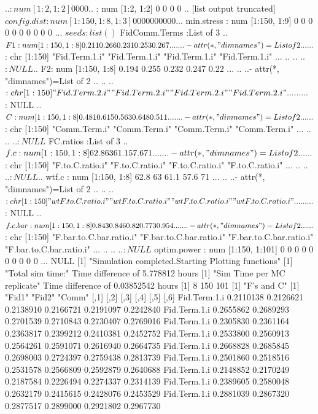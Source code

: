\documentclass[11pt]{article} %
\begin{document}
\begin{Schunk}
\begin{Soutput}
  ..$ : num [1:2, 1:2] 0 0 0 0
  ..$ : num [1:2, 1:2] 0 0 0 0
  .. [list output truncated]
 $ config.dist       : num [1:150, 1:8, 1:3] 0 0 0 0 0 0 0 0 0 0 ...
 $ min.stress        : num [1:150, 1:9] 0 0 0 0 0 0 0 0 0 0 ...
 $ seeds             : list()
 $ FidComm.Terms     :List of 3
  ..$ F1: num [1:150, 1:8] 0.211 0.266 0.231 0.253 0.267 ...
  .. ..- attr(*, "dimnames")=List of 2
  .. .. ..$ : chr [1:150] "Fid.Term.1.i" "Fid.Term.1.i" "Fid.Term.1.i" "Fid.Term.1.i" ...
  .. .. ..$ : NULL
  ..$ F2: num [1:150, 1:8] 0.194 0.255 0.232 0.247 0.22 ...
  .. ..- attr(*, "dimnames")=List of 2
  .. .. ..$ : chr [1:150] "Fid.Term.2.i" "Fid.Term.2.i" "Fid.Term.2.i" "Fid.Term.2.i" ...
  .. .. ..$ : NULL
  ..$ C : num [1:150, 1:8] 0.481 0.615 0.563 0.648 0.511 ...
  .. ..- attr(*, "dimnames")=List of 2
  .. .. ..$ : chr [1:150] "Comm.Term.i" "Comm.Term.i" "Comm.Term.i" "Comm.Term.i" ...
  .. .. ..$ : NULL
 $ FC.ratios         :List of 3
  ..$ f.c    : num [1:150, 1:8] 62.8 63 61.1 57.6 71 ...
  .. ..- attr(*, "dimnames")=List of 2
  .. .. ..$ : chr [1:150] "F.to.C.ratio.i" "F.to.C.ratio.i" "F.to.C.ratio.i" "F.to.C.ratio.i" ...
  .. .. ..$ : NULL
  ..$ wtf.c  : num [1:150, 1:8] 62.8 63 61.1 57.6 71 ...
  .. ..- attr(*, "dimnames")=List of 2
  .. .. ..$ : chr [1:150] "wtF.to.C.ratio.i" "wtF.to.C.ratio.i" "wtF.to.C.ratio.i" "wtF.to.C.ratio.i" ...
  .. .. ..$ : NULL
  ..$ f.c.bar: num [1:150, 1:8] 0.843 0.846 0.82 0.773 0.954 ...
  .. ..- attr(*, "dimnames")=List of 2
  .. .. ..$ : chr [1:150] "F.bar.to.C.bar.ratio.i" "F.bar.to.C.bar.ratio.i" "F.bar.to.C.bar.ratio.i" "F.bar.to.C.bar.ratio.i" ...
  .. .. ..$ : NULL
 $ optim.power       : num [1:150, 1:101] 0 0 0 0 0 0 0 0 0 0 ...
NULL
[1] "Simulation completed.Starting Plotting functions"
[1] "Total sim time:"
Time difference of 5.778812 hours
[1] "Sim Time per MC replicate"
Time difference of 0.03852542 hours
[1]   8 150 101
[1] "F's and C"
[1] "Fid1" "Fid2" "Comm"
                  [,1]      [,2]      [,3]      [,4]      [,5]      [,6]
Fid.Term.1.i 0.2110138 0.2126621 0.2138910 0.2166721 0.2191097 0.2242840
Fid.Term.1.i 0.2655862 0.2689293 0.2701539 0.2710843 0.2730407 0.2769016
Fid.Term.1.i 0.2305830 0.2361164 0.2363817 0.2399212 0.2410381 0.2452752
Fid.Term.1.i 0.2533800 0.2560913 0.2564261 0.2591071 0.2616940 0.2664735
Fid.Term.1.i 0.2668828 0.2685845 0.2698003 0.2724397 0.2759438 0.2813739
Fid.Term.1.i 0.2501860 0.2518516 0.2531578 0.2566809 0.2592879 0.2640688
Fid.Term.1.i 0.2148852 0.2170249 0.2187584 0.2226494 0.2274337 0.2314139
Fid.Term.1.i 0.2389605 0.2580048 0.2632179 0.2415615 0.2428076 0.2453529
Fid.Term.1.i 0.2881039 0.2867320 0.2877517 0.2899000 0.2921802 0.2967730

\end{Soutput}
\end{Schunk}
\end{document}
